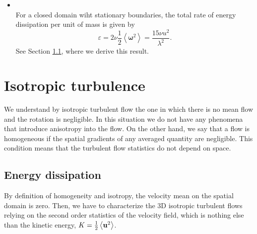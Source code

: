 \begin{itemize}
\item{}\\For a closed domain wiht stationary boundaries, the total rate of energy dissipation per unit of mass is given by
$$\varepsilon=2\nu\frac{1}{2}\left\langle\boldsymbol{\omega}^2\right\rangle=\frac{15\nu u^2}{\lambda^2}.$$
See Section \ref{subsec-isotropic_energy_dissipation}, where we derive this result.
\end{itemize}

\section{Isotropic turbulence}
\label{sec-C3_isotropic_turbulence}
We understand by isotropic turbulent flow the one in which there is no mean flow and the rotation is negligible. In this situation we do not have any phenomena that introduce anisotropy into the flow. On the other hand, we say that a flow is homogeneous if the spatial gradients of any averaged quantity are negligible. This condition means that the turbulent flow statistics do not depend on space.

\subsection{Energy dissipation}
\label{subsec-isotropic_energy_dissipation}
By definition of homogeneity and isotropy, the velocity mean on the spatial domain is zero. Then, we have to characterize the 3D isotropic turbulent flows relying on the second order statistics of the velocity field, which is nothing else than the kinetic energy, $K=\frac{1}{2}\left\langle{\bf u}^2\right\rangle$.

